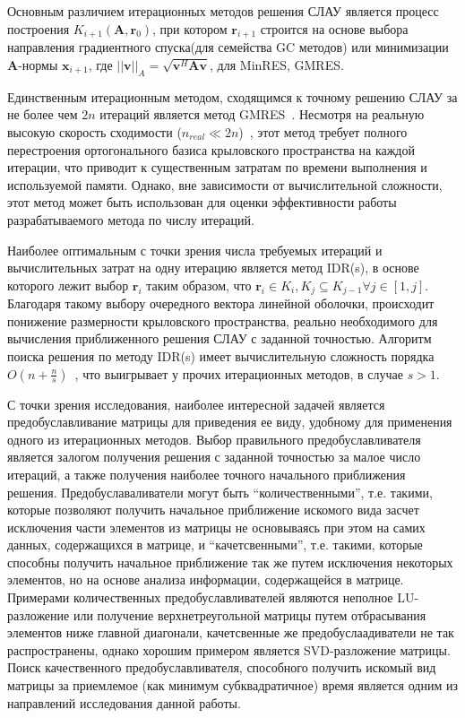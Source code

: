 Основным различием итерационных методов решения СЛАУ является процесс построения $K_{i+1}(\mathbf{A}, \mathbf{r}_0)$, при котором $\mathbf{r}_{i+1}$ строится на основе выбора направления градиентного спуска(для семейства GC методов) или минимизации $\mathbf{A}$-нормы $\mathbf{x}_{i+1}$, где $||\mathbf{v}||_A = \sqrt{\mathbf{v}^H \mathbf{A} \mathbf{v}}$, для MinRES, GMRES.


Единственным итерационным методом, сходящимся к точному решению СЛАУ за не более чем $2n$ итераций является метод GMRES~\cite{krylovOverview}. Несмотря на реальную высокую скорость сходимости ($n_{real} \ll 2n$)~\cite{baseIDRs}, этот метод требует полного перестроения ортогонального базиса крыловского пространства на каждой итерации, что приводит к существенным затратам по времени выполнения и используемой памяти. Однако, вне зависимости от вычислительной сложности, этот метод может быть использован для оценки эффективности работы разрабатываемого метода по числу итераций.


Наиболее оптимальным с точки зрения числа требуемых итераций и вычислительных затрат на одну итерацию является метод IDR(s), в основе которого лежит выбор $\mathbf{r}_i$ таким образом, что $\mathbf{r}_i \in K_{i}, K_{j} \subseteq K_{j-1} \forall j \in [1, j]$. Благодаря такому выбору очередного вектора линейной оболочки, происходит понижение размерности крыловского пространства, реально необходимого для вычисления приближенного решения СЛАУ с заданной точностью. Алгоритм поиска решения по методу IDR(s) имеет вычислительную сложность порядка $O(n + \frac{n}{s})$~\cite{baseIDRs, advancedIDRs}, что выигрывает у прочих итерационных методов, в случае $s > 1$.


С точки зрения исследования, наиболее интересной задачей является предобуславливание матрицы для приведения ее виду, удобному для применения одного из итерационных методов. Выбор правильного предобуславливателя является залогом получения решения с заданной точностью за малое число итераций, а также получения наиболее точного начального приближения решения. Предобуславаливатели могут быть ``количественными'', т.е. такими, которые позволяют получить начальное приближение искомого вида засчет исключения части элементов из матрицы не основываясь при этом на самих данных, содержащихся в матрице, и ``качетсвенными'', т.е. такими, которые способны получить начальное приближение так же путем исключения некоторых элементов, но на основе анализа информации, содержащейся в матрице. Примерами количественных предобуславливателей являются неполное LU-разложение или получение верхнетреугольной матрицы путем отбрасывания элементов ниже главной диагонали, качетсвенные же предобуслаадиватели не так распространены, однако хорошим примером является SVD-разложение матрицы. Поиск качественного предобуславливателя, способного получить искомый вид матрицы за приемлемое (как минимум субквадратичное) время является одним из направлений исследования данной работы.



